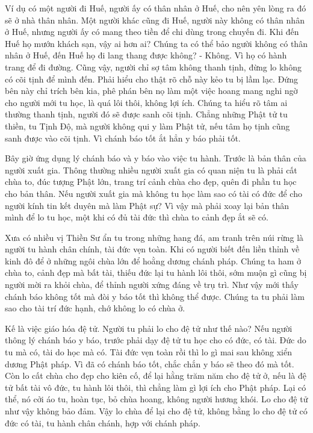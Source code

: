 \documentclass[
  12pt,
  oneside]{book}
\begin{document}
Ví dụ có một người đi Huế, người ấy có thân nhân ở Huế, cho nên yên lòng ra đó sẽ ở nhà thân nhân. Một người khác cũng đi Huế, người này không có thân nhân ở Huế, nhưng người ấy có mang theo tiền để chi dùng trong chuyến đi. Khi đến Huế họ mướn khách sạn, vậy ai hơn ai? Chúng ta có thể bảo người không có thân nhân ở Huế, đến Huế họ đi lang thang được không? - Không. Vì họ có hành trang để đi đường. Cũng vậy, người chỉ sợ tâm không thanh tịnh, đừng lo không có cõi tịnh để mình đến. Phải hiểu cho thật rõ chỗ này kẻo tu bị lầm lạc. Đứng bên này chỉ trích bên kia, phê phán bên nọ làm một việc hoang mang nghi ngờ cho người mới tu học, là quá lôi thôi, không lợi ích. Chúng ta hiểu rõ tâm ai thường thanh tịnh, người đó sẽ được sanh cõi tịnh. Chẳng những Phật tử tu thiền, tu Tịnh Độ, mà người không qui y làm Phật tử, nếu tâm họ tịnh cũng sanh được vào cõi tịnh. Vì chánh báo tốt ắt hẳn y báo phải tốt.

Bây giờ ứng dụng lý chánh báo và y báo vào việc tu hành. Trước là bản thân của người xuất gia. Thông thường nhiều người xuất gia có quan niện tu là phải cất chùa to, đúc tượng Phật lớn, trang trí cảnh chùa cho đẹp, quên đi phần tu học cho bản thân. Nếu người xuất gia mà không tu học làm sao có tài có đức để cho người kính tin kết duyên mà làm Phật sự? Vì vậy mà phải xoay lại bản thân mình để lo tu học, một khi có đủ tài đức thì chùa to cảnh đẹp ắt sẽ có.

Xưa có nhiều vị Thiền Sư ẩn tu trong những hang đá, am tranh trên núi rừng là người tu hành chân chính, tài đức vẹn toàn. Khi có người biết đến liền thỉnh về kinh đô để ở những ngôi chùa lớn để hoằng dương chánh pháp. Chúng ta ham ở chùa to, cảnh đẹp mà bất tài, thiếu đức lại tu hành lôi thôi, sớm muộn gì cũng bị người mời ra khỏi chùa, để thỉnh người xứng đáng về trụ trì. Như vậy mới thấy chánh báo không tốt mà đòi y báo tốt thì không thể được. Chúng ta tu phải làm sao cho tài trí đức hạnh, chớ không lo có chùa ở.

Kế là việc giáo hóa đệ tử. Người tu phải lo cho đệ tử như thế nào? Nếu người thông lý chánh báo y báo, trước phải dạy đệ tử tu học cho có đức, có tài. Đức do tu mà có, tài do học mà có. Tài đức vẹn toàn rồi thì lo gì mai sau không xiển dương Phật pháp. Vì đã có chánh báo tốt, chắc chắn y báo sẽ theo đó mà tốt. Còn lo cất chùa cho đẹp cho kiên cố, để lại hằng trăm năm cho đệ tử ở, nếu là đệ tử bất tài vô đức, tu hành lôi thôi, thì chẳng làm gì lợi ích cho Phật pháp. Lại có thể, nó cởi áo tu, hoàn tục, bỏ chùa hoang, không người hương khói. Lo cho đệ tử như vậy không bảo đảm. Vậy lo chùa để lại cho đệ tử, không bằng lo cho đệ tử có đức có tài, tu hành chân chánh, hợp với chánh pháp.
\end{document}

